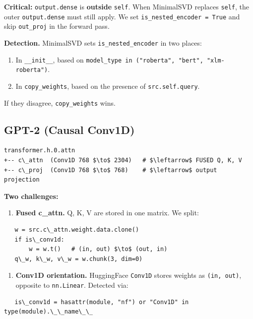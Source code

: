 \textbf{Critical:} \texttt{output.dense} is \textbf{outside} \texttt{self}. When MinimalSVD replaces 
\texttt{self}, the outer \texttt{output.dense} must still apply. We set 
\texttt{is\_nested\_encoder = True} and skip \texttt{out\_proj} in the forward pass.

\textbf{Detection.} MinimalSVD sets \texttt{is\_nested\_encoder} in two places:

\begin{enumerate}
\item In \texttt{\_\_init\_\_}, based on \texttt{model\_type in ("roberta", "bert", "xlm-roberta")}.
\item In \texttt{copy\_weights}, based on the presence of \texttt{src.self.query}.

\end{enumerate}
If they disagree, \texttt{copy\_weights} wins.

\subsection{GPT-2 (Causal Conv1D)}

\begin{lstlisting}
transformer.h.0.attn
+-- c\_attn  (Conv1D 768 $\to$ 2304)   # $\leftarrow$ FUSED Q, K, V
+-- c\_proj  (Conv1D 768 $\to$ 768)    # $\leftarrow$ output projection
\end{lstlisting}

\textbf{Two challenges:}

\begin{enumerate}
\item \textbf{Fused c\_attn.} Q, K, V are stored in one matrix. We split:
\end{enumerate}
\begin{lstlisting}
   w = src.c\_attn.weight.data.clone()
   if is\_conv1d:
       w = w.t()   # (in, out) $\to$ (out, in)
   q\_w, k\_w, v\_w = w.chunk(3, dim=0)
\end{lstlisting}

\begin{enumerate}
\item \textbf{Conv1D orientation.} HuggingFace \texttt{Conv1D} stores weights as \texttt{(in, out)},
  opposite to \texttt{nn.Linear}. Detected via:
\end{enumerate}
\begin{lstlisting}
   is\_conv1d = hasattr(module, "nf") or "Conv1D" in type(module).\_\_name\_\_
\end{lstlisting}

